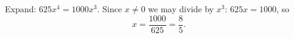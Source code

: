 Expand: $625x^4=1000x^3$. Since $x\ne0$ we may divide by $x^3$: $625x=1000$, so
\[
x=\dfrac{1000}{625}=\boxed{\dfrac{8}{5}}.
\]
